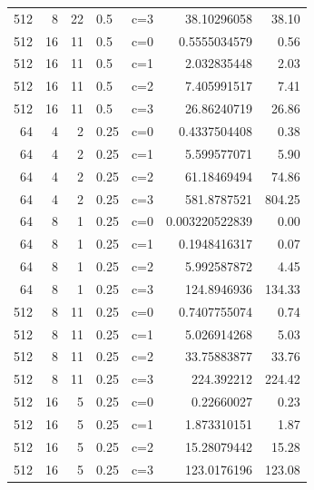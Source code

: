 \begin{longtable}{rrrllrr}
512 & 8 & 22 & 0.5 & c=3 & 38.10296058 & 38.10 \\
512 & 16 & 11 & 0.5 & c=0 & 0.5555034579 & 0.56 \\
512 & 16 & 11 & 0.5 & c=1 & 2.032835448 & 2.03 \\
512 & 16 & 11 & 0.5 & c=2 & 7.405991517 & 7.41 \\
512 & 16 & 11 & 0.5 & c=3 & 26.86240719 & 26.86 \\
64 & 4 & 2 & 0.25 & c=0 & 0.4337504408 & 0.38 \\
64 & 4 & 2 & 0.25 & c=1 & 5.599577071 & 5.90 \\
64 & 4 & 2 & 0.25 & c=2 & 61.18469494 & 74.86 \\
64 & 4 & 2 & 0.25 & c=3 & 581.8787521 & 804.25 \\
64 & 8 & 1 & 0.25 & c=0 & 0.003220522839 & 0.00 \\
64 & 8 & 1 & 0.25 & c=1 & 0.1948416317 & 0.07 \\
64 & 8 & 1 & 0.25 & c=2 & 5.992587872 & 4.45 \\
64 & 8 & 1 & 0.25 & c=3 & 124.8946936 & 134.33 \\
512 & 8 & 11 & 0.25 & c=0 & 0.7407755074 & 0.74 \\
512 & 8 & 11 & 0.25 & c=1 & 5.026914268 & 5.03 \\
512 & 8 & 11 & 0.25 & c=2 & 33.75883877 & 33.76 \\
512 & 8 & 11 & 0.25 & c=3 & 224.392212 & 224.42 \\
512 & 16 & 5 & 0.25 & c=0 & 0.22660027 & 0.23 \\
512 & 16 & 5 & 0.25 & c=1 & 1.873310151 & 1.87 \\
512 & 16 & 5 & 0.25 & c=2 & 15.28079442 & 15.28 \\
512 & 16 & 5 & 0.25 & c=3 & 123.0176196 & 123.08 \\
\end{longtable}

